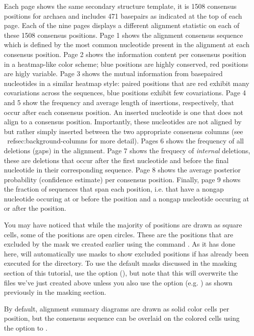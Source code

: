 Each page shows the same secondary structure template, it is 1508
consensus positions for archaea and includes 471 basepairs as
indicated at the top of each page. Each of the nine pages displays a
different alignment statistic on each of these 1508 consensus
positions. Page 1 shows the alignment consensus sequence which is
defined by the most common nucleotide present in the alignment
 at each consensus position. Page 2 shows the
information content per consensus position in a heatmap-like color
scheme; blue positions are highly conserved, red positions are higly
variable. Page 3 shows the mutual information from basepaired
nucleotides in a similar heatmap style: paired positions that are red
exhibit many covariations across the sequences, blue positions exhibit
few covariations. Page 4 and 5 show the frequency and average length
of insertions, respectively, that occur after each consensus
position. An inserted nucleotide is one that does not align to a
consensus position.
Importantly, these nucleotides are not aligned by
 but rather simply inserted between the two
appropriate consensus columns (see ~ref{sec:background-columns} for
more detail). Pages 6 shows the frequency of all
deletions (gaps) in the alignment. Page 7 shows the frequecy of
\emph{internal} deletions, these are deletions that occur after the first
nucleotide and before the final nucleotide in their corresponding
sequence. Page 8 shows the average posterior probability (confidence
estimate) per consensus position. Finally, page 9 shows the fraction
of sequences that span each position, i.e. that have a nongap
nucleotide occuring at or before the position and a nongap nucleotide
occuring at or after the position.

You may have noticed that while the majority of positions are drawn as
square cells, some of the positions are open circles. These are the
positions that are excluded by the mask we created earlier using the
command . As it has done here, 
 will automatically use masks to show excluded
positions if  has already been executed
for the directory. To use the default masks discussed in the masking
section of this tutorial, use the  option (), but note that this will overwrite the files we've just
created above unless you also use the  option
(e.g. ) as shown previously in
the masking section.

By default, alignment summary diagrams are drawn as solid
color cells per position, but the consensus sequence can be overlaid
on the colored cells using the  option to .

